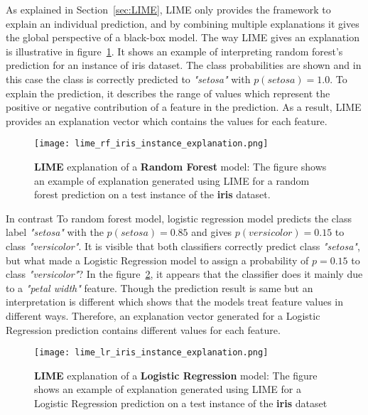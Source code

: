 \documentclass[english]{tktltiki2}
\theoremstyle{definition}
\theoremstyle{remark}
\begin{document}
As explained in Section~\ref{sec:LIME}, LIME only provides the framework to explain an individual prediction, and by combining multiple explanations it gives the global perspective of a black-box model. The way LIME gives an explanation is illustrative in figure~\ref{fig:lime_rf_iris_instance_explanation}. It shows an example of interpreting random forest's prediction for an instance of iris dataset. The class probabilities are shown and in this case the class is correctly predicted to \textit{"setosa"} with $p(setosa)=1.0$. To explain the prediction, it describes the range of values which represent the positive or negative contribution of a feature in the prediction. As a result, LIME provides an explanation vector which contains the values for each feature.
\begin{figure}[H]
	\centering
	\vspace*{5mm}
	\texttt{[image: lime\_rf\_iris\_instance\_explanation.png]}
	\caption{\textbf{LIME} explanation of a \textbf{Random Forest} model: The figure shows an example of explanation generated using LIME for a random forest prediction on a test instance of the \textbf{iris} dataset.}
	\label{fig:lime_rf_iris_instance_explanation}
\end{figure}

In contrast To random forest model, logistic regression model predicts the class label \textit{"setosa"} with the $p(setosa) = 0.85$ and gives $p(versicolor) = 0.15$ to class \textit{"versicolor"}. It is visible that both classifiers correctly predict class \textit{"setosa"}, but what made a Logistic Regression model to assign a probability of $p=0.15$ to class \textit{"versicolor"}? In the figure~\ref{fig:lime_lr_iris_instance_explanation}, it appears that the classifier does it mainly due to a \textit{"petal width"} feature. Though the prediction result is same but an interpretation is different which shows that the models treat feature values in different ways. Therefore, an explanation vector generated for a Logistic Regression prediction contains different values for each feature.
\begin{figure}[H]
	\centering
	\vspace*{5mm}
	\texttt{[image: lime\_lr\_iris\_instance\_explanation.png]}
	\caption{\textbf{LIME} explanation of a \textbf{Logistic Regression} model: The figure shows an example of explanation generated using LIME for a Logistic Regression prediction on a test instance of the \textbf{iris} dataset}
	\label{fig:lime_lr_iris_instance_explanation}
\end{figure} 
\end{document}
